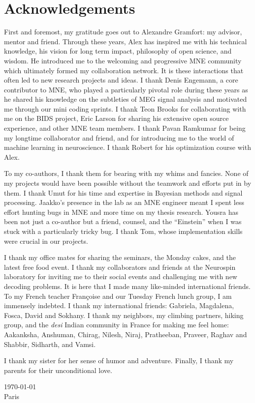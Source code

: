 \chapter*{Acknowledgements}
First and foremost, my gratitude goes out to Alexandre Gramfort: my advisor, mentor and friend. Through these years, Alex has inspired me with his technical knowledge, his vision for long term impact, philosophy of open science, and wisdom. He introduced me to the welcoming and progressive MNE community which ultimately formed my collaboration network. It is these interactions that often led to new research projects and ideas. I thank Denis Engemann, a core contributor to MNE, who played a particularly pivotal role during these years as he shared his knowledge on the subtleties of MEG signal analysis and motivated me through our mini coding sprints. I thank Teon Brooks for collaborating with me on the BIDS project, Eric Larson for sharing his extensive open source experience, and other MNE team members. I thank Pavan Ramkumar for being my longtime collaborator and friend, and for introducing me to the world of machine learning in neuroscience. I thank Robert for his optimization course with Alex.

To my co-authors, I thank them for bearing with my whims and fancies. None of my projects would have been possible without the teamwork and efforts put in by them. I thank Umut for his time and expertise in Bayesian methods and signal processing. Jaakko's presence in the lab as an MNE engineer meant I spent less effort hunting bugs in MNE and more time on my thesis research. Yousra has been not just a co-author but a friend, counsel, and the ``Einstein'' when I was stuck with a particularly tricky bug. I thank Tom, whose implementation skills were crucial in our projects. 

I thank my office mates for sharing the seminars, the Monday cakes, and the latest free food event. I thank my collaborators and friends at the Neurospin laboratory for inviting me to their social events and challenging me with new decoding problems. It is here that I made many like-minded international friends. To my French teacher Françoise and our Tuesday French lunch group, I am immensely indebted. I thank my international friends: Gabriela, Magdalena, Fosca, David and Sokhany. I thank my neighbors, my climbing partners, hiking group, and the \textit{desi} Indian community in France for making me feel home: Aakanksha, Anshuman, Chirag, Nilesh, Niraj, Pratheeban, Praveer, Raghav and Shabbir, Sidharth, and Vamsi.

I thank my sister for her sense of humor and adventure. Finally, I thank my parents for their unconditional love.

\today \\
Paris
